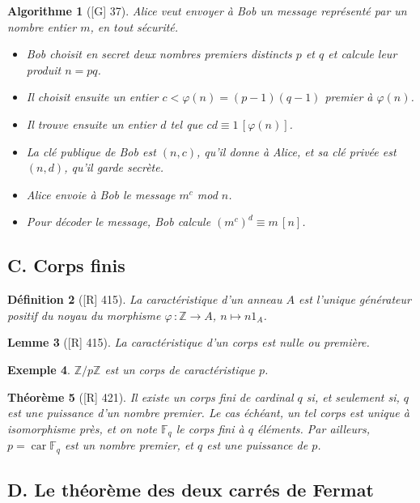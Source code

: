 \documentclass[10pt, a4paper, parskip=full, twoside, twocolumn]{report}
\newtheorem{definition}{Définition}
\newtheorem{theorem}[definition]{Théorème}
\newtheorem{lemma}[definition]{Lemme}
\newtheorem{example}[definition]{Exemple}
\newtheorem{algorithm}[definition]{Algorithme}
\newcommand{\IZ}{\mathbb{Z}}
\newcommand{\IZpZ}{\mathbb{Z}/p\mathbb{Z}}
\newcommand{\IF}{\mathbb{F}}
\DeclareMathOperator{\car}{car}
\begin{document}
\begin{algorithm}[\textnormal{[G] 37}]
	Alice veut envoyer à Bob un message représenté par un nombre 
entier $m$, en tout sécurité.
\begin{itemize}
	\item Bob choisit en secret deux nombres premiers distincts $p$ et $q$ et calcule leur produit $n=pq$.
	\item Il choisit ensuite un entier $c<\varphi(n)=(p-1)(q-1)$ premier à $\varphi(n)$.
	\item Il trouve ensuite un entier $d$ tel que $cd \equiv 1\,[\varphi(n)]$.
	\item La clé publique de Bob est $(n,c)$, qu'il donne à Alice, et sa clé privée est $(n,d)$, qu'il garde secrète.
	\item Alice envoie à Bob le message $m^c$ mod $n$.
	\item Pour décoder le message, Bob calcule $\left(m^c\right)^d\equiv m\,[n]$.
\end{itemize}
\end{algorithm}

\subsection*{C. Corps finis}
\begin{definition}[\textnormal{[R] 415}]
	La \emph{caractéristique} d'un anneau $A$ est l'unique générateur positif du noyau du morphisme $\varphi\,\colon\IZ\to A$, $n\mapsto n1_A$.
\end{definition}

\begin{lemma}[\textnormal{[R] 415}]
	La caractéristique d'un corps est nulle ou première.
\end{lemma}

\begin{example}
	$\IZpZ$ est un corps de caractéristique $p$.
\end{example}

\begin{theorem}[\textnormal{[R] 421}]
	Il existe un corps fini de cardinal $q$ si, et seulement si, $q$ est une puissance d'un nombre premier. 
	Le cas échéant, un tel corps est unique à isomorphisme près, et on note $\IF_q$ le corps fini à $q$ éléments.
	Par ailleurs, $p = \car \IF_q$ est un nombre premier, et $q$ est une puissance de $p$.
\end{theorem}

\subsection*{D. Le théorème des deux carrés de Fermat}
\end{document}
